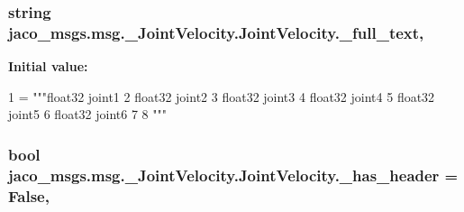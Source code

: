 \subsubsection[{\texorpdfstring{\+\_\+full\+\_\+text}{_full_text}}]{\setlength{\rightskip}{0pt plus 5cm}string jaco\+\_\+msgs.\+msg.\+\_\+\+Joint\+Velocity.\+Joint\+Velocity.\+\_\+full\+\_\+text\hspace{0.3cm}{\ttfamily [static]}, {\ttfamily [private]}}\hypertarget{classjaco__msgs_1_1msg_1_1__JointVelocity_1_1JointVelocity_a8377b6c2480c2c2b18e901dce68640d2}{}\label{classjaco__msgs_1_1msg_1_1__JointVelocity_1_1JointVelocity_a8377b6c2480c2c2b18e901dce68640d2}
{\bfseries Initial value\+:}
\begin{DoxyCode}
1 = \textcolor{stringliteral}{"""float32 joint1}
2 \textcolor{stringliteral}{float32 joint2}
3 \textcolor{stringliteral}{float32 joint3}
4 \textcolor{stringliteral}{float32 joint4}
5 \textcolor{stringliteral}{float32 joint5}
6 \textcolor{stringliteral}{float32 joint6}
7 \textcolor{stringliteral}{}
8 \textcolor{stringliteral}{"""}
\end{DoxyCode}
\subsubsection[{\texorpdfstring{\+\_\+has\+\_\+header}{_has_header}}]{\setlength{\rightskip}{0pt plus 5cm}bool jaco\+\_\+msgs.\+msg.\+\_\+\+Joint\+Velocity.\+Joint\+Velocity.\+\_\+has\+\_\+header = False\hspace{0.3cm}{\ttfamily [static]}, {\ttfamily [private]}}\hypertarget{classjaco__msgs_1_1msg_1_1__JointVelocity_1_1JointVelocity_ae86adb698f3bb642c077c21d38191375}{}\label{classjaco__msgs_1_1msg_1_1__JointVelocity_1_1JointVelocity_ae86adb698f3bb642c077c21d38191375}
